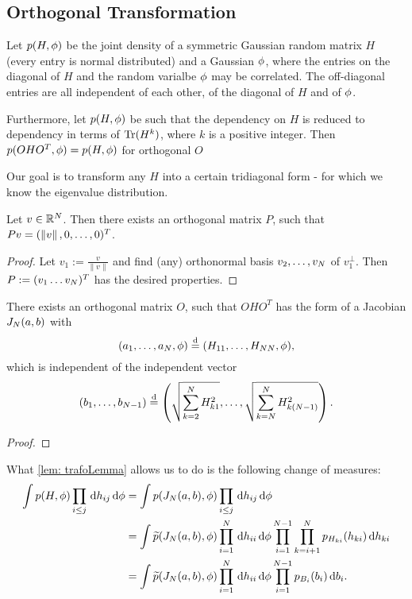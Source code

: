 \subsection{Orthogonal Transformation}

Let $p(H, \phi)$ be the joint density of a symmetric Gaussian random matrix $H$ (every entry is normal distributed) and a Gaussian $\phi$, where the entries on the diagonal of $H$ and the random varialbe $\phi$ may be correlated. The off-diagonal entries are all independent of each other, of the diagonal of $H$ and of $\phi$.

Furthermore, let $p(H,\phi)$ be such that the dependency on $H$ is reduced to dependency in terms of $\operatorname{Tr}(H^k)$, where $k$ is a positive integer. Then $p(OHO^T, \phi) = p(H,\phi)$ for orthogonal $O$ 

Our goal is to transform any $H$ into a certain tridiagonal form - for which we know the eigenvalue distribution.

\begin{lemma}
    Let $v \in \mathbb{R}^N$. Then there exists an orthogonal matrix $P$, such that $Pv = (\left\| v \right\|, 0, \ldots, 0)^T$.
\end{lemma}
\begin{proof}
    Let \(v_1:= \frac{v}{\|v\|}\) and find (any) orthonormal basis
    \(v_2,\dots,v_N\) of \(v_1^\perp\). Then \(P:=(v_1\dots
    v_N)^T\) has the desired properties. 
\end{proof}

\begin{lemma}\label{lem: trafoLemma}
    There exists an orthogonal matrix $O$, such that $OHO^T$ has the form of a Jacobian $J_N(a,b)$ with 
    $$(a_1, \ldots, a_N, \phi) \overset{\text{d}}{=} (H_{11}, \ldots, H_{N N}, \phi),$$ which is independent of the independent vector 
    $$(b_1, \ldots, b_{N-1}) \overset{\text{d}}{=} \left( \sqrt{\sum_{k=2}^{N} H_{k 1}^2}, \ldots, \sqrt{\sum_{k=N}^{N} H_{k (N-1)}^2} \right).$$
\end{lemma}
\begin{proof}
\end{proof}

What \ref{lem: trafoLemma} allows us to do is the following change of measures:
\begin{equation}\label{eq: trafoEquation}
    \begin{split}
        \int p(H,\phi) \prod_{i\leq j} \,\text{d} h_{ij} \,\text{d} \phi
        & = \int p(J_N(a,b), \phi) \prod_{i\leq j} \,\text{d} h_{ij} \,\text{d} \phi \\
        & = \int \widetilde{p}(J_N(a,b), \phi) 
        \prod_{i=1}^N \,\text{d} h_{i i} \,\text{d} \phi 
        \prod_{i=1}^{N-1} \prod_{k=i+1}^{N} p_{H_{k i}}(h_{k i}) \,\text{d} h_{k i}\\
        & = \int \widetilde{p}(J_N(a,b), \phi) 
        \prod_{i=1}^N \,\text{d} h_{i i} \,\text{d} \phi 
        \prod_{i=1}^{N-1} p_{B_i}(b_i) \,\text{d} b_i .
    \end{split}
\end{equation}

